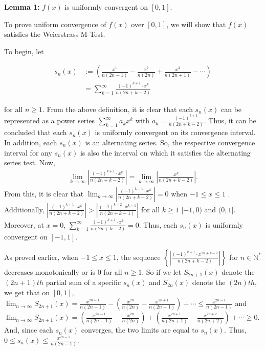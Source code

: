 \documentclass{article}
\begin{document}
\vspace{5mm}

\textbf{Lemma 1:} $f(x)$ is uniformly convergent on $[0, 1]$. 

\vspace{5mm}

To prove uniform convergence of $f(x)$ over $[0, 1]$, we will show that $f(x)$ satisfies the Weierstrass M-Test.

\vspace{5mm}

To begin, let

\begin{align*}
s_n(x) &:= \left(\frac{ x^{1}}{n(2n-1)}-\frac{x^{2}}{n(2n)}+\frac{x^{3}}{n(2n+1)}-\cdots\right) \\ &= \sum_{k=1}^{\infty}\frac{(-1)^{k+1}\cdot x^{k}}{n(2n+k-2)}
\end{align*}

for all $n \geq 1$. From the above definition, it is clear that each $s_n(x)$ can be represented as a power series $\sum_{k=1}^{\infty}a_kx^k$ with $a_k=\frac{(-1)^{k+1}}{n(2n+k-2)}$. Thus, it can be concluded that each $s_n(x)$ is uniformly convergent on its convergence interval. In addition, each $s_n(x)$ is an alternating series. So, the respective convergence interval for any $s_n(x)$ is also   the interval on which it satisfies the alternating series test. Now, 
\begin{align*}
\lim_{k  \to \infty}\left|\frac{(-1)^{k+1}\cdot x^{k}}{n(2n+k-2)}\right|=
\lim_{k  \to \infty}\left|\frac{x^{k}}{n(2n+k-2)}\right|.
\end{align*}
From this, it is clear that $\displaystyle\lim_{k  \to \infty}\left|\frac{(-1)^{k+1}\cdot x^{k}}{n(2n+k-2)}\right|=0$ when $-1 \leq x \leq 1$ . Additionally, $\left|\frac{(-1)^{k+1}\cdot x^{k}}{n(2n+k-2)}\right| > \left|\frac{(-1)^{k+2}\cdot x^{k+1}}{n(2n+k-1)}\right|$ for all $k \ge 1$ $[-1, 0)$ and $(0, 1]$. Moreover, at $x=0$, $\sum_{k=1}^{\infty}\frac{(-1)^{k+1}\cdot x^{k}}{n(2n+k-2)}=0$. Thus, each  $s_n(x)$ is uniformly convergent on $[-1,1]$. 

\vspace{5mm}

As proved earlier, when $-1 \leq x \leq 1$, the sequence $\left\{\left|\frac{(-1)^{k+1}\cdot x^{2n+k-2}}{n(2n+k-2)}\right|\right\}$ for $n \in \mathbb{N^*}$ decreases monotonically or is $0$ for all $n \geq 1$. So if we let $S_{2n+1}(x)$ denote the $(2n+1)th$ partial sum of a specific $s_n(x)$ and $S_{2n}(x)$ denote the $(2n)th$, we get that on $[0, 1]$, \newline $\displaystyle \lim_{n \to \infty} S_{2n+1}(x) = \frac{x^{2n-1}}{n(2n-1)}- \left(\frac{x^{2n}}{n(2n)}-\frac{x^{2n+1}}{n(2n+1)}\right)-\cdots \leq \frac{x^{2n-1}}{n(2n-1)}$ and $\displaystyle \lim_{n \to \infty} S_{2n+1}(x) = \left(\frac{x^{2n-1}}{n(2n-1)}-\frac{x^{2n}}{n(2n)}\right) + \left(\frac{x^{2n+1}}{n(2n+1)}-\frac{x^{2n+2}}{n(2n+2)}\right)+\cdots \geq 0$. And, since each $s_n(x)$ converges, the two limits are equal to $s_n(x)$. Thus, $0 \leq s_n(x) \leq \frac{x^{2n-1}}{n(2n-1)}$. 
\end{document}
